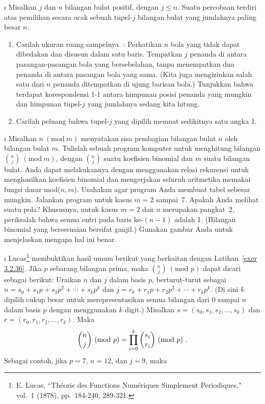\begin{LJSItem}
\i\label{exer 3.2.35.5} Misalkan $j$ dan $n$ bilangan bulat positif, dengan $j \le n$.
Suatu percobaan terdiri atas pemilihan secara acak sebuah tupel-$j$ bilangan bulat
 yang jumlahnya paling besar $n$.
\begin{enumerate}
\item Carilah ukuran ruang sampelnya.  : Perhatikan $n$ bola yang tidak
dapat dibedakan dan disusun dalam satu baris.  Tempatkan $j$ penanda di antara
pasangan-pasangan bola yang bersebelahan, tanpa menempatkan dua penanda di antara
pasangan bola yang sama.  (Kita juga mengizinkan salah satu dari $n$ penanda ditempatkan
di ujung barisan bola.)  Tunjukkan bahwa terdapat korespondensi 1-1 antara
himpunan posisi penanda yang mungkin dan himpunan tupel-$j$ yang jumlahnya sedang kita
hitung.
\item Carilah peluang bahwa tupel-$j$ yang dipilih memuat sedikitnya satu angka 1.
\end{enumerate}

\i\label{exer 3.2.36} Misalkan $n\ (\mbox{mod}\ m)$ menyatakan sisa pembagian bilangan
bulat $n$ oleh bilangan bulat $m$.  Tulislah sebuah program komputer untuk menghitung
bilangan ${n \choose j}\ (\mbox{mod}\ m)$, dengan ${n \choose j}$ suatu koefisien
binomial dan $m$ suatu bilangan bulat.  Anda dapat melakukannya dengan menggunakan
relasi rekurensi untuk menghasilkan koefisien binomial dan mengerjakan seluruh
aritmetika memakai fungsi dasar mod($n,m$).  Usahakan agar program Anda membuat tabel
sebesar mungkin.  Jalankan program untuk kasus $m = 2$ sampai~7.  Apakah Anda melihat
suatu pola?  Khususnya, untuk kasus $m = 2$ dan $n$ merupakan pangkat~2, periksalah bahwa
semua entri pada baris ke-$(n - 1)$ adalah 1.  (Bilangan binomial yang bersesuaian
bersifat ganjil.)  Gunakan gambar Anda untuk menjelaskan mengapa hal ini benar.

\i\label{exer 3.2.37} Lucas\footnote{E. Lucas, ``Th\'eorie des Functions
Num\'eriques Simplement Periodiques,"  vol.~1 (1878), pp.~184-240,
289-321.} membuktikan hasil umum berikut yang berkaitan dengan Latihan~\ref{exer
3.2.36}.  Jika $p$ sebarang bilangan prima, maka ${n
\choose j}~ (\mbox{mod\ }p)$ dapat dicari sebagai berikut: Uraikan $n$ dan $j$ dalam
basis $p$, berturut-turut sebagai $n = s_0 + s_1p + s_2p^2 + \cdots + s_kp^k$ dan $j =
r_0 + r_1p + r_2p^2 + \cdots + r_kp^k$.  (Di sini $k$ dipilih cukup besar untuk
merepresentasikan semua bilangan dari 0 sampai $n$ dalam basis $p$ dengan menggunakan
$k$ digit.)  Misalkan $s = (s_0,s_1,s_2,\dots,s_k)$ dan $r =
(r_0,r_1,r_2,\dots,r_k)$.  Maka
$$
 {n \choose j}~(\mbox{mod\ }p) = \prod_{i = 0}^k   {{s_i} \choose {r_i}}~(\mbox{mod\
}p)\ .
$$ Sebagai contoh, jika $p = 7$, $n = 12$, dan $j = 9$, maka


\end{LJSItem}
